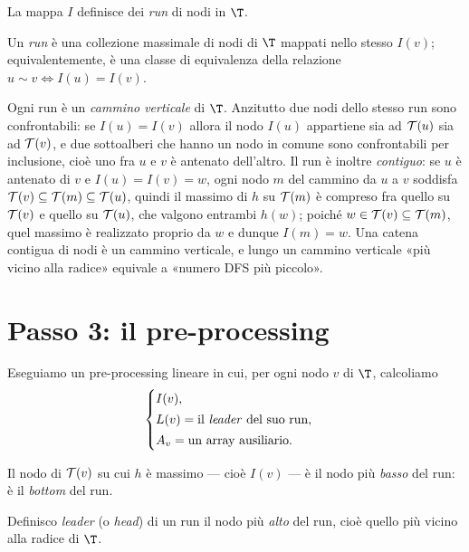 La mappa $I$ definisce dei \emph{run} di nodi in $\T$.

\begin{definizione}[run]\label{def:run}
  Un \emph{run} è una collezione massimale di nodi di $\T$ mappati nello stesso $I(v)$;
  equivalentemente, è una classe di equivalenza della relazione
  $u \sim v \iff I(u) = I(v)$.
\end{definizione}

\begin{osservazione}
  Ogni run è un \emph{cammino verticale} di $\T$. Anzitutto due nodi dello stesso run
  sono confrontabili: se $I(u)=I(v)$ allora il nodo $I(u)$ appartiene sia ad
  $\mathcal{T}(u)$ sia ad $\mathcal{T}(v)$, e due sottoalberi che hanno un nodo in comune sono
  confrontabili per inclusione, cioè uno fra $u$ e $v$ è antenato dell'altro. Il run è
  inoltre \emph{contiguo}: se $u$ è antenato di $v$ e $I(u)=I(v)=w$, ogni nodo $m$ del
  cammino da $u$ a $v$ soddisfa $\mathcal{T}(v)\subseteq\mathcal{T}(m)\subseteq\mathcal{T}(u)$,
  quindi il massimo di $h$ su $\mathcal{T}(m)$ è compreso fra quello su $\mathcal{T}(v)$ e
  quello su $\mathcal{T}(u)$, che valgono entrambi $h(w)$; poiché $w\in\mathcal{T}(v)\subseteq
  \mathcal{T}(m)$, quel massimo è realizzato proprio da $w$ e dunque $I(m)=w$. Una catena
  contigua di nodi è un cammino verticale, e lungo un cammino verticale «più vicino
  alla radice» equivale a «numero DFS più piccolo».
\end{osservazione}

\section{Passo 3: il pre-processing}\label{sec:lca-preprocessing}


Eseguiamo un pre-processing lineare in cui, per ogni nodo $v$ di $\T$, calcoliamo
\[
  \begin{cases}
    I(v),\\[2pt]
    L(v) = \text{il \emph{leader} del suo run},\\[2pt]
    A_v = \text{un array ausiliario}.
  \end{cases}
\]

\begin{osservazione}
  Il nodo di $\mathcal{T}(v)$ su cui $h$ è massimo --- cioè $I(v)$ --- è il nodo più
  \emph{basso} del run: è il \emph{bottom} del run.
\end{osservazione}

\begin{definizione}\label{def:leader}
  Definisco \emph{leader} (o \emph{head}) di un run il nodo più \emph{alto} del run,
  cioè quello più vicino alla radice di $\T$.
\end{definizione}

